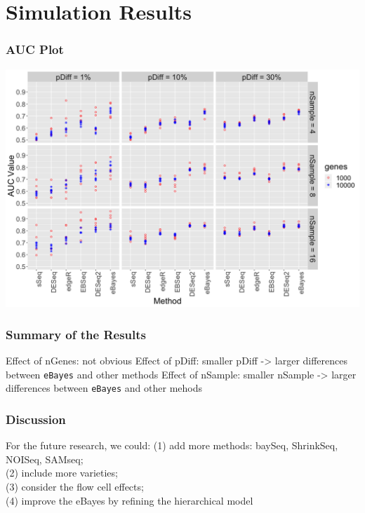\documentclass[handout,10pt]{beamer}
\begin{document}
\section{Simulation Results}
\begin{frame}

\frametitle{AUC Plot}
\begin{center}
\includegraphics{auc_plot}
\end{center}

\end{frame}


\begin{frame}
\frametitle{Summary of the Results}


Effect of nGenes: not obvious
\newline
\newline
Effect of pDiff: smaller pDiff -> larger differences between {\tt eBayes} and other methods
\newline
\newline
Effect of nSample: smaller nSample -> larger differences between {\tt eBayes} and other mehods



\end{frame}

\begin{frame}
\frametitle{Discussion}

For the future research, we could:
\newline
(1) add more methods: baySeq, ShrinkSeq, NOISeq, SAMseq;\\
(2) include more varieties;\\
(3) consider the flow cell effects;\\
(4) improve the eBayes by refining the hierarchical model

\end{frame}
\end{document}
